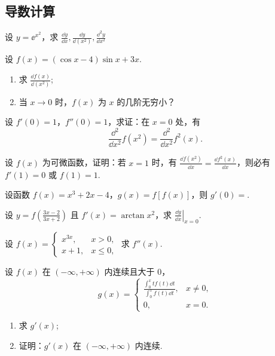 \subsection{导数计算}
	
	\begin{ti}
		设 $y = \ee^{x^{2}}$，求 $\frac{\dd{y}}{\dd{x}}, \frac{\dd{y}}{\dd{\left( x^{2} \right)}}, \frac{\dd^{2}{y}}{\dd{x^{2}}}$
	\end{ti}

	\begin{ti}
		设 $f(x) = (\cos x - 4)\sin x + 3x$.
		\begin{enumerate}
			\item 求 $\frac{\dd{f(x)}}{\dd{\left( x^{2} \right)}}$;
			\item 当 $x \to 0$ 时，$f(x)$ 为 $x$ 的几阶无穷小？
		\end{enumerate}
	\end{ti}

	\begin{ti}
		设 $f'(0) = 1$，$f''(0) = 1$，求证：在 $x = 0$ 处，有
		\[
			\frac{\dd^{2}}{\dd{x^{2}}} f\left( x^{2} \right) = \frac{\dd^{2}}{\dd{x^{2}}} f^{2}(x).
		\]
	\end{ti}

	\begin{ti}
		设 $f(x)$ 为可微函数，证明：若 $x = 1$ 时，有 $\frac{\dd{f\left( x^{2} \right)}}{\dd{x}} = \frac{\dd{f^{2}(x)}}{\dd{x}}$，则必有 $f'(1) = 0$ 或 $f(1) = 1$.
	\end{ti}
	
	\begin{ti}
		设函数 $f(x) = x^{3} + 2x - 4$，$g(x) = f[f(x)]$，则 $g'(0) =$\htwo.
	\end{ti}

	\begin{ti}
		设 $y = f\left( \frac{3x - 2}{3x + 2} \right)$ 且 $f'(x) = \arctan x^{2}$，求 $\left. \frac{\dd{y}}{\dd{x}} \right|_{x = 0}$.
	\end{ti}

	\begin{ti}
		设 $f(x) = \begin{cases}
			x^{3x}, & x > 0,\\
			x + 1, & x \leq 0,
		\end{cases}$ 求 $f''(x)$.
	\end{ti}

	\begin{ti}
		设 $f(x)$ 在 $(-\infty,+\infty)$ 内连续且大于 $0$，
		\[
			g(x) = \begin{cases}
				\frac{\int_{0}^{x} tf(t) \dd{t}}{\int_{0}^{x} f(t) \dd{t}}, & x \ne 0,\\
				0, & x = 0.
			\end{cases}
		\]
		\begin{enumerate}
			\item 求 $g'(x)$;
			\item 证明：$g'(x)$ 在 $(-\infty,+\infty)$ 内连续.
		\end{enumerate}
	\end{ti}

